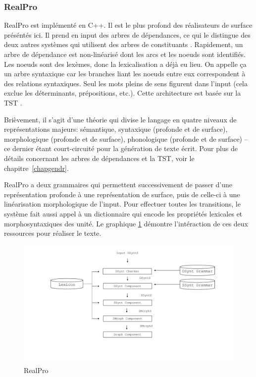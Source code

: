 \subsubsection{RealPro}
RealPro \citep{LavoieFastPortableRealizer1997} est implémenté en C++. Il est le plus profond des réalisateurs de surface préséntés ici. Il prend en input des arbres de dépendances, ce qui le distingue des deux autres systèmes qui utilisent des arbres de constituants \citep{DBLP:conf/enlg/MolinsL15,GattSimpleNLGRealisationEngine2009}. Rapidement, un arbre de dépendance est non-linéarisé dont les arcs et les noeuds sont identifiés. Les noeuds sont des lexèmes, donc la lexicalisation a déjà eu lieu. On appelle ça un arbre syntaxique car les branches liant les noeuds entre eux correspondent à des relations syntaxiques. Seul les mots pleins de sens figurent dans l'input (cela exclue les déterminants, prépositions, etc.). Cette architecture est basée sur la \ac{TST} \citep{melcuk1988}. 

Brièvement, il s'agit d'une théorie qui divise le langage en quatre niveaux de représentations majeurs: sémantique, syntaxique (profonde et de surface), morphologique (profonde et de surface), phonologique (profonde et de surface) -- ce dernier étant court-circuité pour la génération de texte écrit. Pour plus de détails concernant les arbres de dépendances et la \ac{TST}, voir le chapitre~\ref{chapgendr}.

RealPro a deux grammaires qui permettent successivement de passer d'une représentation profonde à une représentation de surface, puis de celle-ci à une linéarisation morphologique de l'input. Pour effectuer toutes les transitions, le système fait aussi appel à un dictionnaire qui encode les propriétés lexicales et morphosyntaxiques des unité. Le graphique \ref{fig:RealPro} démontre l'intéraction de ces deux ressources pour réaliser le texte.

\begin{figure}[htb]
	\centering
	\includegraphics[width=1\textwidth, trim = {0cm 0cm 0cm 0cm},clip]{ch2/figs/realpro.pdf}
	\caption{RealPro}
	\label{fig:RealPro}
\end{figure}

